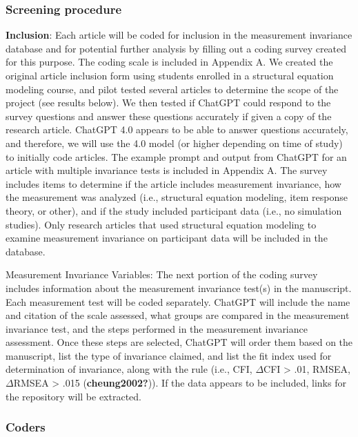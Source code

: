 \documentclass[
  man]{apa7}
\begin{document}
\subsubsection{Screening procedure}\label{screening-procedure}

\textbf{Inclusion}: Each article will be coded for inclusion in the measurement invariance database and for potential further analysis by filling out a coding survey created for this purpose. The coding scale is included in Appendix A. We created the original article inclusion form using students enrolled in a structural equation modeling course, and pilot tested several articles to determine the scope of the project (see results below). We then tested if ChatGPT could respond to the survey questions and answer these questions accurately if given a copy of the research article. ChatGPT 4.0 appears to be able to answer questions accurately, and therefore, we will use the 4.0 model (or higher depending on time of study) to initially code articles. The example prompt and output from ChatGPT for an article with multiple invariance tests is included in Appendix A. The survey includes items to determine if the article includes measurement invariance, how the measurement was analyzed (i.e., structural equation modeling, item response theory, or other), and if the study included participant data (i.e., no simulation studies). Only research articles that used structural equation modeling to examine measurement invariance on participant data will be included in the database.

Measurement Invariance Variables: The next portion of the coding survey includes information about the measurement invariance test(s) in the manuscript. Each measurement test will be coded separately. ChatGPT will include the name and citation of the scale assessed, what groups are compared in the measurement invariance test, and the steps performed in the measurement invariance assessment. Once these steps are selected, ChatGPT will order them based on the manuscript, list the type of invariance claimed, and list the fit index used for determination of invariance, along with the rule (i.e., CFI, \(\Delta\)CFI \textgreater{} .01, RMSEA, \(\Delta\)RMSEA \textgreater{} .015 (\textbf{cheung2002?})). If the data appears to be included, links for the repository will be extracted.

\subsubsection{Coders}\label{coders}
\end{document}
